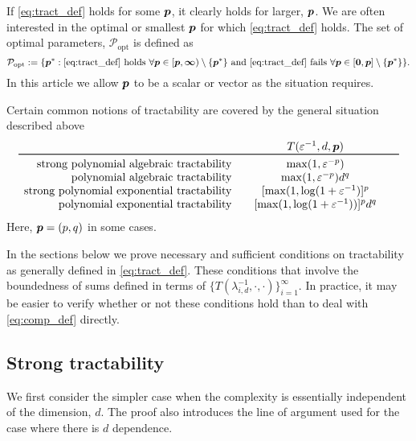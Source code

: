 \documentclass[11pt,a4paper]{article}
\begin{document}
If \eqref{eq:tract_def} holds for some $\boldsymbol{p}$, it clearly holds for larger, $\boldsymbol{p}$.  We are often interested in the optimal or smallest $\boldsymbol{p}$ for which \eqref{eq:tract_def} holds.
The  set of optimal parameters, $\mathcal{P}_{\text{opt}}$ is defined as
\begin{equation}
	\mathcal{P}_{\text{opt}} : = \{\boldsymbol{p}^* : \eqref{eq:tract_def} \text{ holds }\forall \boldsymbol{p} \in [\boldsymbol{p},\boldsymbol{\infty}) \setminus \{\boldsymbol{p}^*\} \text{ and }
	\eqref{eq:tract_def} \text{ fails } \forall \boldsymbol{p} \in [\boldsymbol{0},\boldsymbol{p}] \setminus \{\boldsymbol{p}^*\} \}.
\end{equation}
In this article we allow $\boldsymbol{p}$ to be a scalar or vector as the situation requires.

Certain common notions of tractability are covered by the general situation described above
\begin{equation*}
	\begin{array}{r@{\qquad}c@{\qquad}c}
		& T(\varepsilon^{-1},d,\vp)\\
		\toprule
		\text{strong polynomial algebraic  tractability} & \max(1,\varepsilon^{-p})\\
		\text{polynomial algebraic tractability} & \max(1,\varepsilon^{-p})d^{q}\\
		\text{strong polynomial exponential tractability} &  [\max(1,\log(1 + \varepsilon^{-1})]^p\\
		\text{polynomial exponential tractability} &
		[\max(1,\log(1 + \varepsilon^{-1}))]^p  d^{q}
	\end{array}
\end{equation*}
Here, $\boldsymbol{p} = (p,q)$ in some cases.


In the sections below we prove necessary and sufficient conditions on tractability as generally defined in \eqref{eq:tract_def}.  These conditions  that involve the boundedness of sums defined in terms of $\{T(\lambda_{i,d}^{-1},\cdot, \cdot)\}_{i=1}^\infty$.  In practice, it may be easier to verify whether or not these conditions hold than to deal with \eqref{eq:comp_def} directly.


\subsection{Strong tractability}

We first consider the simpler case when the complexity is essentially independent of the dimension, $d$.  The proof also introduces the line of argument used for the case where there is $d$ dependence.
\end{document}
